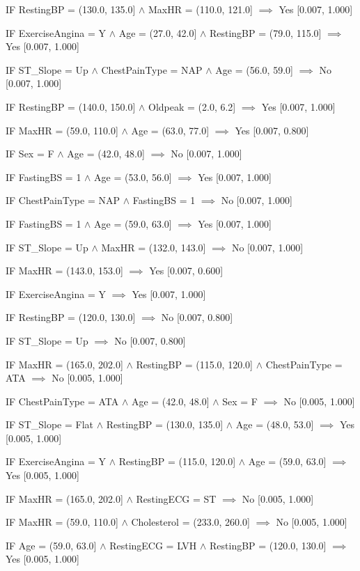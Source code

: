 IF RestingBP = (130.0, 135.0] $\land$ MaxHR = (110.0, 121.0] $\implies$ Yes [0.007, 1.000]

IF ExerciseAngina = Y $\land$ Age = (27.0, 42.0] $\land$ RestingBP = (79.0, 115.0] $\implies$ Yes [0.007, 1.000]

IF ST_Slope = Up $\land$ ChestPainType = NAP $\land$ Age = (56.0, 59.0] $\implies$ No [0.007, 1.000]

IF RestingBP = (140.0, 150.0] $\land$ Oldpeak = (2.0, 6.2] $\implies$ Yes [0.007, 1.000]

IF MaxHR = (59.0, 110.0] $\land$ Age = (63.0, 77.0] $\implies$ Yes [0.007, 0.800]

IF Sex = F $\land$ Age = (42.0, 48.0] $\implies$ No [0.007, 1.000]

IF FastingBS = 1 $\land$ Age = (53.0, 56.0] $\implies$ Yes [0.007, 1.000]

IF ChestPainType = NAP $\land$ FastingBS = 1 $\implies$ No [0.007, 1.000]

IF FastingBS = 1 $\land$ Age = (59.0, 63.0] $\implies$ Yes [0.007, 1.000]

IF ST_Slope = Up $\land$ MaxHR = (132.0, 143.0] $\implies$ No [0.007, 1.000]

IF MaxHR = (143.0, 153.0] $\implies$ Yes [0.007, 0.600]

IF ExerciseAngina = Y $\implies$ Yes [0.007, 1.000]

IF RestingBP = (120.0, 130.0] $\implies$ No [0.007, 0.800]

IF ST_Slope = Up $\implies$ No [0.007, 0.800]

IF MaxHR = (165.0, 202.0] $\land$ RestingBP = (115.0, 120.0] $\land$ ChestPainType = ATA $\implies$ No [0.005, 1.000]

IF ChestPainType = ATA $\land$ Age = (42.0, 48.0] $\land$ Sex = F $\implies$ No [0.005, 1.000]

IF ST_Slope = Flat $\land$ RestingBP = (130.0, 135.0] $\land$ Age = (48.0, 53.0] $\implies$ Yes [0.005, 1.000]

IF ExerciseAngina = Y $\land$ RestingBP = (115.0, 120.0] $\land$ Age = (59.0, 63.0] $\implies$ Yes [0.005, 1.000]

IF MaxHR = (165.0, 202.0] $\land$ RestingECG = ST $\implies$ No [0.005, 1.000]

IF MaxHR = (59.0, 110.0] $\land$ Cholesterol = (233.0, 260.0] $\implies$ No [0.005, 1.000]

IF Age = (59.0, 63.0] $\land$ RestingECG = LVH $\land$ RestingBP = (120.0, 130.0] $\implies$ Yes [0.005, 1.000]

